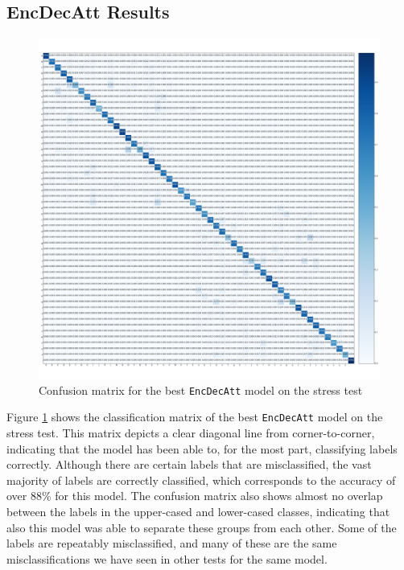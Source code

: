 \subsection{EncDecAtt Results}
\begin{figure}[H]
    \centering
    \includegraphics[width=1\textwidth]{fig/results/experiment4/encdecatt/confusion_matrix.png}
    \caption{Confusion matrix for the best {\tt EncDecAtt} model on the stress test}
    \label{fig:result4_encdecatt_confusion_matrix}
\end{figure}

Figure \ref{fig:result4_encdecatt_confusion_matrix} shows the classification matrix of the best {\tt EncDecAtt} model on the stress test. This matrix depicts a clear diagonal line from corner-to-corner, indicating that the model has been able to, for the most part, classifying labels correctly. Although there are certain labels that are misclassified, the vast majority of labels are correctly classified, which corresponds to the accuracy of over 88\% for this model. The confusion matrix also shows almost no overlap between the labels in the upper-cased and lower-cased classes, indicating that also this model was able to separate these groups from each other. Some of the labels are repeatably misclassified, and many of these are the same misclassifications we have seen in other tests for the same model.

